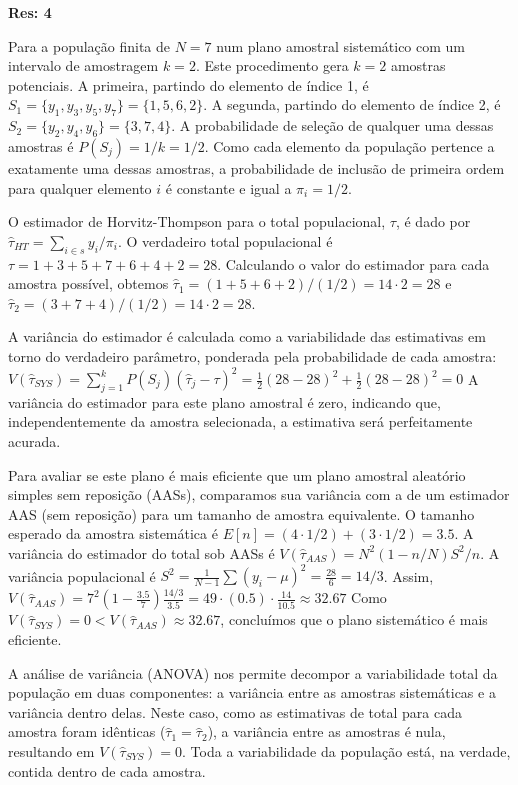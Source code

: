 \documentclass[a4paper,11pt,oneside,twocolumn]{Config/milktest}
\begin{document}
\medskip
{\scriptsize  {\bf Res: 4}
	
Para a população finita de $N=7$ num plano amostral sistemático com um intervalo de amostragem $k=2$. Este procedimento gera $k=2$ amostras potenciais. A primeira, partindo do elemento de índice 1, é $S_1 = \{y_1, y_3, y_5, y_7\} = \{1, 5, 6, 2\}$. A segunda, partindo do elemento de índice 2, é $S_2 = \{y_2, y_4, y_6\} = \{3, 7, 4\}$. A probabilidade de seleção de qualquer uma dessas amostras é $P(S_j) = 1/k = 1/2$. Como cada elemento da população pertence a exatamente uma dessas amostras, a probabilidade de inclusão de primeira ordem para qualquer elemento $i$ é constante e igual a $\pi_i = 1/2$.

O estimador de Horvitz-Thompson para o total populacional, $\tau$, é dado por $\hat{\tau}_{HT} = \sum_{i \in s} y_i / \pi_i$. O verdadeiro total populacional é $\tau = 1+3+5+7+6+4+2 = 28$. Calculando o valor do estimador para cada amostra possível, obtemos $\hat{\tau}_1 = (1+5+6+2)/(1/2) = 14 \cdot 2 = 28$ e $\hat{\tau}_2 = (3+7+4)/(1/2) = 14 \cdot 2 = 28$.

A variância do estimador é calculada como a variabilidade das estimativas em torno do verdadeiro parâmetro, ponderada pela probabilidade de cada amostra:
$ V(\hat{\tau}_{SYS}) = \sum_{j=1}^{k} P(S_j) (\hat{\tau}_j - \tau)^2 = \frac{1}{2}(28 - 28)^2 + \frac{1}{2}(28 - 28)^2 = 0 $
A variância do estimador para este plano amostral é zero, indicando que, independentemente da amostra selecionada, a estimativa será perfeitamente acurada.

Para avaliar se este plano é mais eficiente que um plano amostral aleatório simples sem reposição (AASs), comparamos sua variância com a de um estimador AAS (sem reposição) para um tamanho de amostra equivalente. O tamanho esperado da amostra sistemática é $E[n] = (4 \cdot 1/2) + (3 \cdot 1/2) = 3.5$. A variância do estimador do total sob AASs é $V(\hat{\tau}_{AAS}) = N^2 (1 - n/N) S^2/n$. A variância populacional é $S^2 = \frac{1}{N-1}\sum(y_i - \mu)^2 = \frac{28}{6} = 14/3$. Assim,
$ V(\hat{\tau}_{AAS}) = 7^2 \left(1 - \frac{3.5}{7}\right) \frac{14/3}{3.5} = 49 \cdot (0.5) \cdot \frac{14}{10.5} \approx 32.67 $
Como $V(\hat{\tau}_{SYS}) = 0 < V(\hat{\tau}_{AAS}) \approx 32.67$, concluímos que o plano sistemático é  mais eficiente.

A análise de variância (ANOVA) nos permite decompor a variabilidade total da população em duas componentes: a variância entre as amostras sistemáticas e a variância dentro delas. Neste caso, como as estimativas de total para cada amostra foram idênticas ($\hat{\tau}_1 = \hat{\tau}_2$), a variância entre as amostras é nula, resultando em $V(\hat{\tau}_{SYS})=0$. Toda a variabilidade da população está, na verdade, contida dentro de cada amostra.

}
\end{document}
